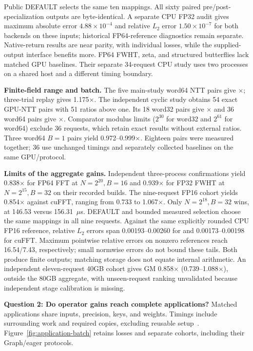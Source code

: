 Public DEFAULT selects the same ten mappings. All sixty paired
pre/post-specialization outputs are byte-identical. A separate CPU FP32 audit
gives maximum absolute error $4.88\times10^{-4}$ and relative
$L_2$ error $1.50\times10^{-7}$ for both backends on these inputs;
historical FP64-reference diagnostics remain separate.
Native-return results are near parity, with individual losses, while the
supplied-output interface benefits more. FP64 FWHT, zeta, and structured
butterflies lack matched GPU baselines. Their separate 34-request CPU study
uses two processes on a shared host and a different timing boundary.

\textbf{Finite-field range and batch.}
The five main-study word64 NTT pairs give \CurrentNTT$\times$; three-trial
replay gives 1.175$\times$. The independent cyclic study obtains 54 exact
GPU-NTT pairs with 51 ratios above one. Its 18 word32 pairs give
\CurrentCyclicNTTWordThirtyTwo$\times$ and 36 word64 pairs give
\CurrentCyclicNTTWordSixtyFour$\times$. Comparator modulus limits ($2^{30}$ for word32 and $2^{61}$
for word64) exclude 36 requests, which retain exact \system{} results
without external ratios. Three word64 $B=1$ pairs yield 0.972--0.999$\times$.
Eighteen pairs were measured together; 36 use unchanged \system{} timings
and separately collected baselines on the same GPU/protocol.

\textbf{Limits of the aggregate gains.}
Independent three-process confirmations yield 0.838$\times$ for FP64 FFT
at $N=2^{20},B=16$ and 0.939$\times$ for FP32 FWHT at $N=2^{15},B=32$
on their recorded builds. The nine-request FP16 cohort yields 0.854$\times$
against cuFFT, ranging from 0.733 to 1.067$\times$. Only
$N=2^{18},B=32$ wins, at 146.53 versus 156.31~$\mu$s. DEFAULT and bounded
measured selection choose the same mappings in all nine requests.
Against the same explicitly rounded CPU FP16 reference, relative $L_2$ errors
span 0.00193--0.00260 for \system{} and 0.00173--0.00198 for cuFFT.
Maximum pointwise relative errors on nonzero references reach 16.54/7.43,
respectively; small normwise errors do not bound these tails.
Both produce finite outputs; matching storage does not equate internal arithmetic.
An independent eleven-request 40GB cohort gives GM 0.858$\times$
(0.739--1.088$\times$), outside the 80GB aggregate, with unseen-request
ranking unvalidated because independent stage calibration is missing.


\textbf{Question 2: Do operator gains reach complete applications?}
\label{sec:application-evaluation}
Matched applications share inputs, precision, keys, and weights. Timings include
surrounding work and required copies, excluding reusable setup~\cite{heongpucode}.
Figure~\ref{fig:application-batch} retains losses and separate cohorts, including
their Graph/eager protocols.

